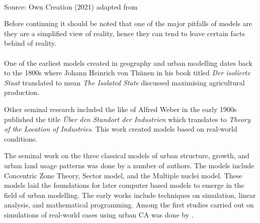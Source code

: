 \begin{center}
\\Source: Own Creation (2021) adapted from \citep{liu2008modelling}
\end{center}
Before continuing it should be noted that one of the major pitfalls of models are they are a simplified view of reality, hence they can tend to leave certain facts behind of reality.\citep{liu2008modelling}\\\\
One of the earliest models created in geography and urban modelling dates back to the 1800s where Johann Heinrich von Th{\"u}nen in his book titled \textsl{Der isolierte Staat} translated to mean \textsl{The Isolated State} discussed maximising agricultural production.\citep{clark1967thunen}

Other seminal research included the like of Alfred Weber in the early 1900s published the title \textsl{{\"U}ber den Standort der Industrien} which translates to \textsl{Theory of the Location of Industries}. This work created models based on real-world conditions.\citep{fearon2006alfred}

The seminal work on the three classical models of urban structure, growth, and urban land usage patterns was done by a number of authors. The models include Concentric Zone Theory, Sector model, and the Multiple nuclei model.\citep{liu2008modelling}
These models laid the foundations for later computer based models to emerge in the field of urban modelling. The early works include techniques on simulation, linear analysis, and mathematical programming.\citep{kilbridge1970population}
Among the first studies carried out on simulations of real-world cases using urban CA was done by \citep{batty}.

